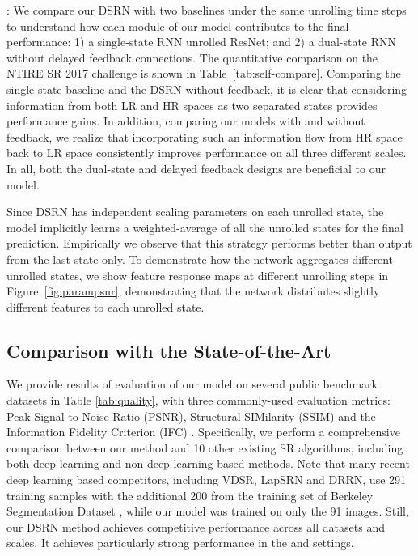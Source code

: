 \documentclass[10pt,twocolumn,letterpaper]{article}
\newcommand{\algname}{DSRN }
\begin{document}
\vspace*{0.05in}
: We compare our \algname with two baselines under the same unrolling time steps to understand how each module of our model contributes to the final performance: 1) a single-state RNN unrolled ResNet; and 2) a dual-state RNN without delayed feedback connections.   
The quantitative comparison on the NTIRE SR 2017 challenge is shown in Table~\ref{tab:self-compare}.   
Comparing the single-state baseline and the \algname without feedback, it is clear that considering information from both LR and HR spaces as two separated states provides performance gains.   In addition, comparing our models with and without feedback, we realize that incorporating such an information flow from HR space back to LR space consistently improves performance on all three different scales.   In all, both the dual-state and delayed feedback designs are beneficial to our model.

 Since DSRN has independent scaling parameters on each unrolled state, the model implicitly learns a weighted-average of all the unrolled states for the final prediction. Empirically we observe that this strategy performs better than output from the last state only. To demonstrate how the network aggregates different unrolled states, we show feature response maps at different unrolling steps in Figure~\ref{fig:parampsnr}, demonstrating that the network distributes slightly different features to each unrolled state.






\subsection{Comparison with the State-of-the-Art}

We provide results of evaluation of our model on several public benchmark datasets in Table \ref{tab:quality}, with three commonly-used evaluation metrics: Peak Signal-to-Noise Ratio (PSNR), Structural SIMilarity (SSIM) \cite{wang2004image} and the Information Fidelity Criterion (IFC) \cite{sheikh2005information}.  Specifically, we perform a comprehensive comparison between our method and 10 other existing SR algorithms, including both deep learning and non-deep-learning based methods.  Note that many recent deep learning based competitors, including VDSR, LapSRN and DRRN,  use 291 training samples with the additional 200 from the training set of Berkeley Segmentation Dataset \cite{arbelaez2011contour}, while our model was trained on only the 91 images.  Still, our \algname method achieves competitive performance across all datasets and scales.  It achieves particularly strong performance in the  and  settings. 
\end{document}
